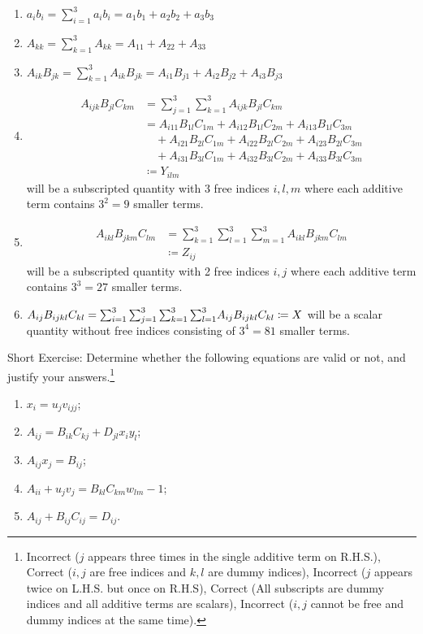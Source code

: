 \begin{enumerate}
    \item $a_ib_i = \sum_{i=1}^3 a_ib_i = a_1b_1 + a_2b_2 + a_3b_3$
    \item $A_{kk} = \sum_{k=1}^3 A_{kk} = A_{11} + A_{22} + A_{33}$
    \item $A_{ik}B_{jk} = \sum_{k=1}^3 A_{ik}B_{jk} = A_{i1}B_{j1} + A_{i2}B_{j2} + A_{i3}B_{j3}$
    \item \begin{align*}
    A_{ijk}B_{jl}C_{km} &= \sum_{j=1}^3 \sum_{k=1}^3 A_{ijk}B_{jl}C_{km} \\
    &= A_{i11}B_{1l}C_{1m} + A_{i12}B_{1l}C_{2m} + A_{i13}B_{1l}C_{3m} \\
    &\quad + A_{i21}B_{2l}C_{1m} + A_{i22}B_{2l}C_{2m} + A_{i23}B_{2l}C_{3m} \\
    &\quad + A_{i31}B_{3l}C_{1m} + A_{i32}B_{3l}C_{2m} + A_{i33}B_{3l}C_{3m} \\
    &\coloneq Y_{ilm}
    \end{align*}
    will be a subscripted quantity with 3 free indices $i, l, m$ where each additive term contains $3^2 = 9$ smaller terms.
    \item \begin{align*}
    A_{ikl}B_{jkm}C_{lm} &= \sum_{k=1}^3 \sum_{l=1}^3 \sum_{m=1}^3 A_{ikl}B_{jkm}C_{lm} \\
    &\coloneq Z_{ij}
    \end{align*}
    will be a subscripted quantity with 2 free indices $i, j$ where each additive term contains $3^3 = 27$ smaller terms.
    \item $A_{ij}B_{ijkl}C_{kl} = \smash{\sum_{i=1}^3 \sum_{j=1}^3 \sum_{k=1}^3 \sum_{l=1}^3} A_{ij}B_{ijkl}C_{kl} \coloneq X$ will be a scalar quantity without free indices consisting of $3^4 = 81$ smaller terms.
\end{enumerate}
Short Exercise: Determine whether the following equations are valid or not, and justify your answers.\footnote{Incorrect ($j$ appears three times in the single additive term on R.H.S.), Correct ($i,j$ are free indices and $k,l$ are dummy indices), Incorrect ($j$ appears twice on L.H.S. but once on R.H.S), Correct (All subscripts are dummy indices and all additive terms are scalars), Incorrect ($i,j$ cannot be free and dummy indices at the same time).}
\begin{enumerate}
    \item $x_i = u_jv_{ijj}$;
    \item $A_{ij} = B_{ik}C_{kj} + D_{jl}x_iy_l$;
    \item $A_{ij}x_j = B_{ij}$;
    \item $A_{ii} + u_jv_j = B_{kl}C_{km}w_{lm} - 1$;
    \item $A_{ij} + B_{ij}C_{ij} = D_{ij}$.
\end{enumerate}

